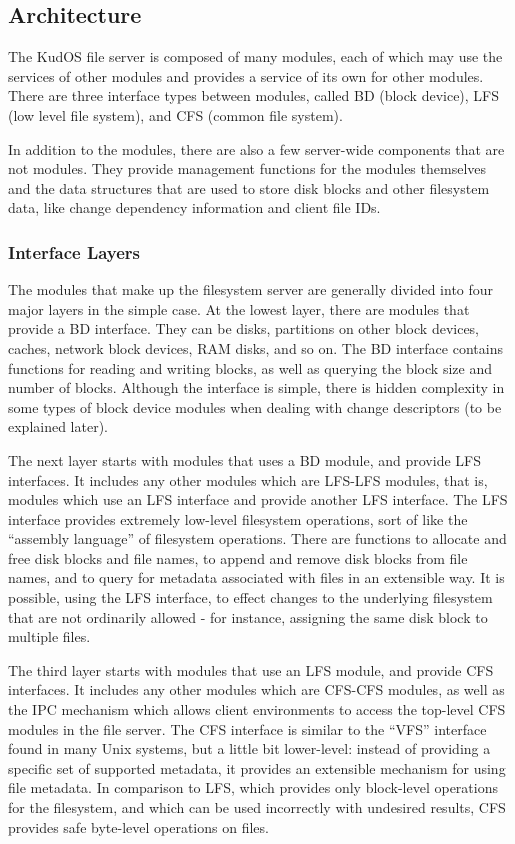 \subsection{Architecture}
\label{sec:solution:arch}

The KudOS file server is composed of many modules, each of which may use the
services of other modules and provides a service of its own for other modules.
There are three interface types between modules, called BD (block device), LFS
(low level file system), and CFS (common file system).

In addition to the modules, there are also a few server-wide components that are
not modules. They provide management functions for the modules themselves and
the data structures that are used to store disk blocks and other filesystem
data, like change dependency information and client file IDs.

\subsubsection{Interface Layers}

The modules that make up the filesystem server are generally divided into four
major layers in the simple case. At the lowest layer, there are modules that
provide a BD interface. They can be disks, partitions on other block devices,
caches, network block devices, RAM disks, and so on. The BD interface contains
functions for reading and writing blocks, as well as querying the block size and
number of blocks. Although the interface is simple, there is hidden complexity
in some types of block device modules when dealing with change descriptors (to
be explained later).

The next layer starts with modules that uses a BD module, and provide LFS
interfaces. It includes any other modules which are LFS-LFS modules, that is,
modules which use an LFS interface and provide another LFS interface. The LFS
interface provides extremely low-level filesystem operations, sort of like the
``assembly language'' of filesystem operations. There are functions to allocate
and free disk blocks and file names, to append and remove disk blocks from file
names, and to query for metadata associated with files in an extensible way. It
is possible, using the LFS interface, to effect changes to the underlying
filesystem that are not ordinarily allowed - for instance, assigning the same
disk block to multiple files.

The third layer starts with modules that use an LFS module, and provide CFS
interfaces. It includes any other modules which are CFS-CFS modules, as well as
the IPC mechanism which allows client environments to access the top-level CFS
modules in the file server. The CFS interface is similar to the ``VFS''
interface found in many Unix systems, but a little bit lower-level: instead of
providing a specific set of supported metadata, it provides an extensible
mechanism for using file metadata. In comparison to LFS, which provides only
block-level operations for the filesystem, and which can be used incorrectly
with undesired results, CFS provides safe byte-level operations on files.

